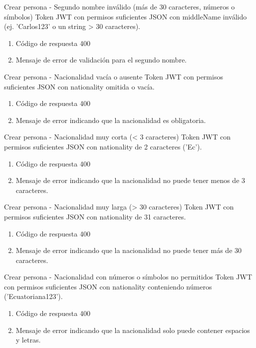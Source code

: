 {Crear persona - Segundo nombre inválido (más de 30 caracteres, números o símbolos)}
{Token JWT con permisos suficientes}
{JSON con middleName inválido (ej. 'Carlos123' o un string > 30 caracteres).}
{\begin{enumerate} [leftmargin=*, nosep]
    \item Código de respuesta 400
    \item Mensaje de error de validación para el segundo nombre.
\end{enumerate}}

{Crear persona - Nacionalidad vacía o ausente}
{Token JWT con permisos suficientes}
{JSON con nationality omitida o vacía.}
{\begin{enumerate} [leftmargin=*, nosep]
    \item Código de respuesta 400
    \item Mensaje de error indicando que la nacionalidad es obligatoria.
\end{enumerate}}

{Crear persona - Nacionalidad muy corta (< 3 caracteres)}
{Token JWT con permisos suficientes}
{JSON con nationality de 2 caracteres ('Ec').}
{\begin{enumerate} [leftmargin=*, nosep]
    \item Código de respuesta 400
    \item Mensaje de error indicando que la nacionalidad no puede tener menos de 3 caracteres.
\end{enumerate}}

{Crear persona - Nacionalidad muy larga (> 30 caracteres)}
{Token JWT con permisos suficientes}
{JSON con nationality de 31 caracteres.}
{\begin{enumerate} [leftmargin=*, nosep]
    \item Código de respuesta 400
    \item Mensaje de error indicando que la nacionalidad no puede tener más de 30 caracteres.
\end{enumerate}}

{Crear persona - Nacionalidad con números o símbolos no permitidos}
{Token JWT con permisos suficientes}
{JSON con nationality conteniendo números ('Ecuatoriana123').}
{\begin{enumerate} [leftmargin=*, nosep]
    \item Código de respuesta 400
    \item Mensaje de error indicando que la nacionalidad solo puede contener espacios y letras.
\end{enumerate}}

